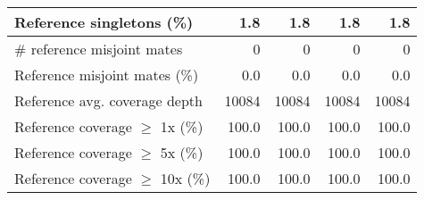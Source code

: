 \documentclass[12pt,a4paper]{article}
\begin{document}
\begin{table}[ht]
\begin{center}
\begin{tabular}{|l*{4}{|r}|}
Reference singletons (\%) & 1.8 & 1.8 & 1.8 & 1.8 \\ \hline
\# reference misjoint mates & 0 & 0 & 0 & 0 \\ \hline
Reference misjoint mates (\%) & 0.0 & 0.0 & 0.0 & 0.0 \\ \hline
Reference avg. coverage depth & 10084 & 10084 & 10084 & 10084 \\ \hline
Reference coverage $\geq$ 1x (\%) & 100.0 & 100.0 & 100.0 & 100.0 \\ \hline
Reference coverage $\geq$ 5x (\%) & 100.0 & 100.0 & 100.0 & 100.0 \\ \hline
Reference coverage $\geq$ 10x (\%) & 100.0 & 100.0 & 100.0 & 100.0 \\ \hline
\end{tabular}
\end{center}
\end{table}
\end{document}
